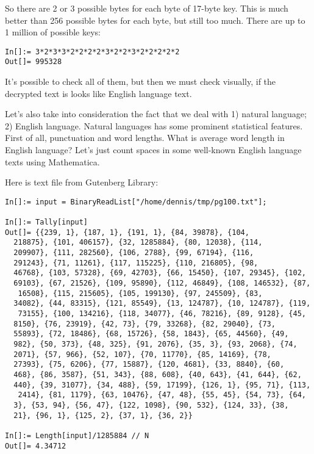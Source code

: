 So there are 2 or 3 possible bytes for each byte of 17-byte key.
This is much better than 256 possible bytes for each byte, but still too much.
There are up to 1 million of possible keys:

\begin{lstlisting}[caption=Mathematica]
In[]:= 3*2*3*3*2*2*2*2*3*2*2*3*2*2*2*2*2
Out[]= 995328
\end{lstlisting}

It's possible to check all of them, but then we must check visually, if the decrypted text is looks like English language text.

Let's also take into consideration the fact that we deal with 1) natural language; 2) English language.
Natural languages has some prominent statistical features.
First of all, punctuation and word lengths.
What is average word length in English language?
Let's just count spaces in some well-known English language texts using Mathematica.

Here is \href{http://www.gutenberg.org/cache/epub/100/pg100.txt}{} text file from Gutenberg Library:

\begin{lstlisting}[caption=Mathematica]
In[]:= input = BinaryReadList["/home/dennis/tmp/pg100.txt"];

In[]:= Tally[input]
Out[]= {{239, 1}, {187, 1}, {191, 1}, {84, 39878}, {104, 
  218875}, {101, 406157}, {32, 1285884}, {80, 12038}, {114, 
  209907}, {111, 282560}, {106, 2788}, {99, 67194}, {116, 
  291243}, {71, 11261}, {117, 115225}, {110, 216805}, {98, 
  46768}, {103, 57328}, {69, 42703}, {66, 15450}, {107, 29345}, {102, 
  69103}, {67, 21526}, {109, 95890}, {112, 46849}, {108, 146532}, {87,
   16508}, {115, 215605}, {105, 199130}, {97, 245509}, {83, 
  34082}, {44, 83315}, {121, 85549}, {13, 124787}, {10, 124787}, {119,
   73155}, {100, 134216}, {118, 34077}, {46, 78216}, {89, 9128}, {45, 
  8150}, {76, 23919}, {42, 73}, {79, 33268}, {82, 29040}, {73, 
  55893}, {72, 18486}, {68, 15726}, {58, 1843}, {65, 44560}, {49, 
  982}, {50, 373}, {48, 325}, {91, 2076}, {35, 3}, {93, 2068}, {74, 
  2071}, {57, 966}, {52, 107}, {70, 11770}, {85, 14169}, {78, 
  27393}, {75, 6206}, {77, 15887}, {120, 4681}, {33, 8840}, {60, 
  468}, {86, 3587}, {51, 343}, {88, 608}, {40, 643}, {41, 644}, {62, 
  440}, {39, 31077}, {34, 488}, {59, 17199}, {126, 1}, {95, 71}, {113,
   2414}, {81, 1179}, {63, 10476}, {47, 48}, {55, 45}, {54, 73}, {64, 
  3}, {53, 94}, {56, 47}, {122, 1098}, {90, 532}, {124, 33}, {38, 
  21}, {96, 1}, {125, 2}, {37, 1}, {36, 2}}

In[]:= Length[input]/1285884 // N
Out[]= 4.34712
\end{lstlisting}

